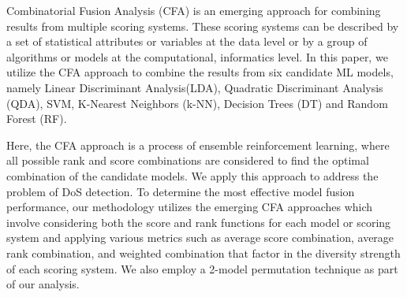 \begin{comment}
\begin{table*}[ht!]
\caption{Types of network traffic in the LYCOS-IDS dataset and their training and testing sets.}
\label{tab:lycos3}
\centering
\begin{small}
\begin{tabular}{lll}
Traffic & Training & Test\\ \hline
Benign & 330474 & 110,158 \\
DoS\_hulk & 119241 & 39,747 \\
Portscan & 119197 & 39,732 \\
DDoS & 71761 & 23,920 \\
DoS\_goldeneye & 5073 & 1,691 \\
DoS\_slowloris & 4255 & 1,418 \\
DoS\_slowhttptest & 3649 & 1,216 \\
FTP\_patator & 3001 & 1,000 \\
SSH\_patator & 2218 & 739 \\
Webattack\_bruteforce & 1020 & 340 \\
Bot & 550 & 183 \\
Webattack\_xss & 489 & 163 \\
Webattack\_sql\_injection & 9 & 3 \\
Heartbleed & 7 & 2 \\
\hline
Total & 660944 &  220,312 \\
\end{tabular}
\end{small}
\end{table*}
\end{comment}

Combinatorial Fusion Analysis (CFA) is an emerging approach for combining results from multiple scoring systems. These scoring systems can be described by a set of statistical attributes or variables at the data level or by a group of algorithms or models at the computational, informatics level. In this paper, we utilize the CFA approach to combine the results from six candidate ML models, namely Linear Discriminant Analysis(LDA), Quadratic Discriminant Analysis (QDA), SVM, K-Nearest Neighbors (k-NN), Decision Trees (DT) and Random Forest (RF).

Here, the CFA approach is a process of ensemble reinforcement learning, where all possible rank and score combinations are considered to find the optimal combination of the candidate models. We apply this approach to address the problem of DoS detection. To determine the most effective model fusion performance, our methodology utilizes the emerging CFA approaches which involve considering both the score and rank functions for each model or scoring system and applying various metrics such as average score combination, average rank combination, and weighted combination that factor in the diversity strength of each scoring system. We also employ a 2-model permutation technique as part of our analysis. 


